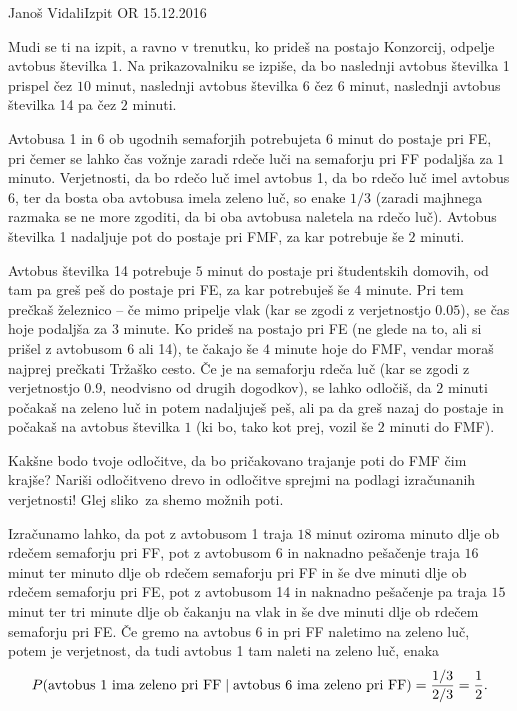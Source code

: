 \begin{naloga}{Janoš Vidali}{Izpit OR 15.12.2016}
\begin{vprasanje}
Mudi se ti na izpit, a ravno v trenutku,
ko prideš na postajo Konzorcij, odpelje avtobus številka 1.
Na prikazovalniku se izpiše,
da bo naslednji avtobus številka 1 prispel čez $10$ minut,
naslednji avtobus številka 6 čez $6$ minut,
naslednji avtobus številka 14 pa čez $2$ minuti.

Avtobusa 1 in 6 ob ugodnih semaforjih potrebujeta $6$ minut do postaje pri FE,
pri čemer se lahko čas vož\-nje zaradi rdeče luči na semaforju pri FF
podaljša za $1$ minuto.
Verjetnosti, da bo rdečo luč imel avtobus 1, da bo rdečo luč imel avtobus 6,
ter da bosta oba avtobusa imela zeleno luč, so enake $1/3$
(zaradi majhnega razmaka se ne more zgoditi,
da bi oba avtobusa naletela na rdečo luč).
Avtobus številka 1 nadaljuje pot do postaje pri FMF,
za kar potrebuje še $2$ minuti.

Avtobus številka 14 potrebuje $5$ minut do postaje pri študentskih domovih,
od tam pa greš peš do postaje pri FE, za kar potrebuješ še $4$ minute.
Pri tem prečkaš že\-lez\-ni\-co -- če mimo pripelje vlak
(kar se zgodi z verjetnostjo $0.05$),
se čas hoje podaljša za $3$ minute.
Ko prideš na postajo pri FE
(ne glede na to, ali si prišel z avtobusom 6 ali 14),
te čakajo še $4$ minute hoje do FMF,
vendar moraš najprej prečkati Tržaško cesto.
Če je na semaforju rdeča luč
(kar se zgodi z verjetnostjo 0.9, neodvisno od drugih dogodkov),
se lahko odločiš, da $2$ minuti počakaš na zeleno luč in potem nadaljuješ peš,
ali pa da greš nazaj do postaje in počakaš na avtobus številka $1$
(ki bo, tako kot prej, vozil še $2$ minuti do FMF).

Kakšne bodo tvoje odločitve,
da bo pričakovano trajanje poti do FMF čim krajše?
Nariši od\-lo\-čit\-ve\-no drevo
in odločitve sprejmi na podlagi izračunanih verjetnosti!
Glej sliko~\fig za shemo možnih poti.

\begin{slika}
\pgfslika
{}
\end{slika}
\end{vprasanje}

\begin{odgovor}
Izračunamo lahko,
da pot z avtobusom 1 traja $18$ minut
oziroma minuto dlje ob rdečem semaforju pri FF,
pot z avtobusom 6 in naknadno pešačenje traja $16$ minut
ter minuto dlje ob rdečem semaforju pri FF
in še dve minuti dlje ob rdečem semaforju pri FE,
pot z avtobusom 14 in naknadno pešačenje pa traja $15$ minut
ter tri minute dlje ob čakanju na vlak
in še dve minuti dlje ob rdečem semaforju pri FE.
Če gremo na avtobus 6 in pri FF naletimo na zeleno luč,
potem je verjetnost, da tudi avtobus 1 tam naleti na zeleno luč, enaka
$$
P(\text{avtobus 1 ima zeleno pri FF} \;|\; \text{avtobus 6 ima zeleno pri FF})
= {1/3 \over 2/3} = {1 \over 2} .
$$


\end{odgovor}
\end{naloga}
